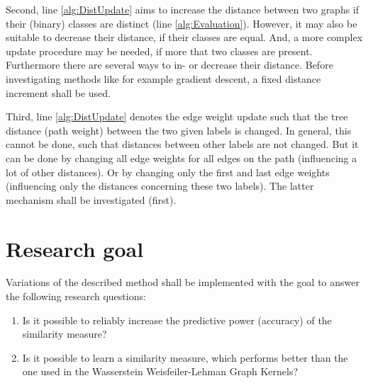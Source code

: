 Second, line \ref{alg:DistUpdate} aims to increase the distance between two graphs if their (binary) classes are distinct (line \ref{alg:Evaluation}).
However, it may also be suitable to decrease their distance, if their classes are equal.
And, a more complex update procedure may be needed, if more that two classes are present.
Furthermore there are several ways to in- or decrease their distance.
Before investigating methods like for example gradient descent, a fixed distance increment shall be used.

Third, line \ref{alg:DistUpdate} denotes the edge weight update such that the tree distance (path weight) between the two given labels is changed.
In general, this cannot be done, such that distances between other labels are not changed.
But it can be done by changing all edge weights for all edges on the path (influencing a lot of other distances).
Or by changing only the first and last edge weights (influencing only the distances concerning these two labels).
The latter mechanism shall be investigated (first).


\section{Research goal}\label{sec:research_goal}


Variations of the described method shall be implemented with the goal to answer the following research questions:
\begin{enumerate}
	\item Is it possible to reliably increase the predictive power (accuracy) of the similarity measure?
	\item Is it possible to learn a similarity measure, which performs better than the one used in the Wasserstein Weisfeiler-Lehman Graph Kernels?	
\end{enumerate} 

